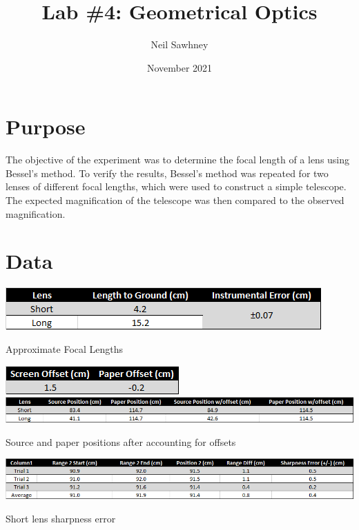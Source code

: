 \documentclass{report}
\title{Lab \#4: Geometrical Optics}
\author{Neil Sawhney}
\date{November 2021}
\begin{document}


\maketitle
\tableofcontents

\chapter{Purpose}
The objective of the experiment was to determine the focal length of a lens using Bessel's method. To verify the results, Bessel's method was repeated for two lenses of different focal lengths, which were used to construct a simple telescope. The expected magnification of the telescope was then compared to the observed magnification.

\chapter{Data}

\begin{table}[H]
    \centering
    \includegraphics{approxFocalLengths.png}
    \caption{Approximate Focal Lengths}
    \label{approxFocalLengths}
\end{table}
\bigskip

\begin{table}[H]
    \centering
    \includegraphics{offsets.png}
    \includegraphics[width = \textwidth]{offsetPositions.png}
    \caption{Source and paper positions after accounting for offsets}
\end{table}
\bigskip

\begin{table}[H]
    \centering
    \includegraphics[width = \textwidth]{shortLensSharpnessError.png}
    \caption{Short lens sharpness error}
    \label{shortLensSharpnessError}
\end{table}
\bigskip
\end{document}
